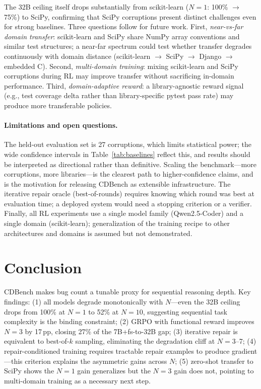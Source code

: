 \documentclass[12pt]{article}
\begin{document}
The 32B ceiling itself drops substantially from scikit-learn ($N{=}1$: 100\%
$\to$ 75\%) to SciPy, confirming that SciPy corruptions present distinct
challenges even for strong baselines. Three questions follow for future work.
First, \emph{near-vs-far domain transfer}: scikit-learn and SciPy share NumPy
array conventions and similar test structures; a near-far spectrum could test
whether transfer degrades continuously with domain distance (scikit-learn
$\to$ SciPy $\to$ Django $\to$ embedded C). Second, \emph{multi-domain training}:
mixing scikit-learn and SciPy corruptions during RL may improve transfer
without sacrificing in-domain performance. Third, \emph{domain-adaptive reward}:
a library-agnostic reward signal (e.g., test coverage delta rather than
library-specific pytest pass rate) may produce more transferable policies.

\paragraph{Limitations and open questions.}
The held-out evaluation set is 27 corruptions, which limits statistical power;
the wide confidence intervals in Table~\ref{tab:baselines} reflect this, and
results should be interpreted as directional rather than definitive. Scaling the
benchmark---more corruptions, more libraries---is the clearest path to
higher-confidence claims, and is the motivation for releasing CDBench as
extensible infrastructure. The iterative repair oracle (best-of-rounds) requires
knowing which round was best at evaluation time; a deployed system would need a
stopping criterion or a verifier. Finally, all RL experiments use a
single model family (Qwen2.5-Coder) and a single domain (scikit-learn);
generalization of the training recipe to other architectures and domains is
assumed but not demonstrated.

\section{Conclusion}
\label{sec:conclusion}

CDBench makes bug count a tunable proxy for sequential reasoning depth. Key
findings: (1) all models degrade monotonically with $N$---even the 32B ceiling
drops from 100\% at $N{=}1$ to 52\% at $N{=}10$, suggesting sequential task
complexity is the binding constraint; (2) GRPO with functional reward improves
$N{=}3$ by 17\,pp, closing 27\% of the 7B+fs-to-32B gap; (3) iterative repair
is equivalent to best-of-$k$ sampling, eliminating the degradation cliff at
$N{=}3$--7; (4) repair-conditioned training requires tractable repair examples
to produce gradient---this criterion explains the asymmetric gains across $N$;
(5) zero-shot transfer to SciPy shows the $N{=}1$ gain generalizes but the
$N{=}3$ gain does not, pointing to multi-domain training as a necessary next step.
\end{document}
